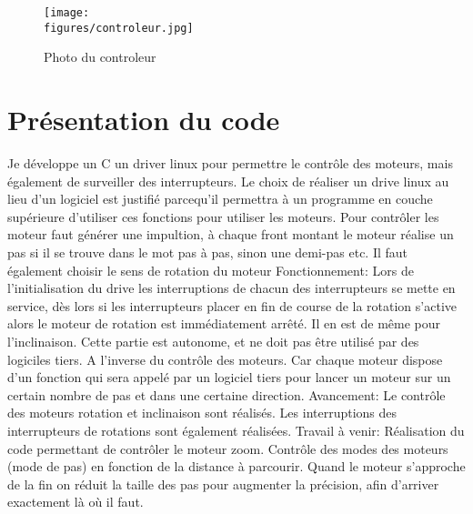\begin{figure}[H]
    \centering
	\texttt{[image: \\figures/controleur.jpg]}
    \decoRule
    \caption[
    Photo du controleur]{
    Photo du controleur}
    \label{fig:Photo du controleur}
    \end{figure}


\section{Présentation du code}

Je développe un C un driver linux pour permettre le contrôle des moteurs, mais également de surveiller des interrupteurs. \newline
Le choix de réaliser un drive linux au lieu d'un logiciel est justifié parcequ'il permettra à un programme en couche supérieure d'utiliser ces fonctions pour utiliser les moteurs.\newline
Pour contrôler les moteur faut générer une impultion, à chaque front montant le moteur réalise un pas si il se trouve dans le mot pas à pas, sinon une demi-pas etc. Il faut également choisir le sens de rotation du moteur \newline \newline
Fonctionnement: \newline
Lors de l'initialisation du drive les interruptions de chacun des interrupteurs se mette en service, dès lors si les interrupteurs placer en fin de course de la rotation s'active alors le moteur de rotation est immédiatement arrêté. Il en est de même pour l'inclinaison. Cette partie est autonome, et ne doit pas être utilisé par des logiciles tiers. A l'inverse du contrôle des moteurs. Car chaque moteur dispose d'un fonction qui sera appelé par un logiciel tiers pour lancer un moteur sur un certain nombre de pas et dans une certaine direction.
\newline \newline
Avancement:\newline
Le contrôle des moteurs rotation et inclinaison sont réalisés. Les interruptions des interrupteurs de rotations sont également réalisées.
\newline \newline
Travail à venir:\newline
Réalisation du code permettant de contrôler le moteur zoom. \newline
Contrôle des modes des moteurs (mode de pas) en fonction de la distance à parcourir. Quand le moteur s'approche de la fin on réduit la taille des pas pour augmenter la précision, afin d'arriver exactement là où il faut.\newline


